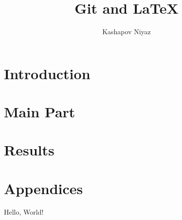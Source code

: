 \documentclass[12pt]{article}
\title{\textbf{ Git and \LaTeX{}}}
\author{Kashapov Niyaz}
\date{}
\begin{document}
\maketitle

\section{Introduction}


\section{Main Part}

\section{Results}

\section{Appendices}

\newpage

\begin{thebibliography}{9} 
 Hello, World!
\end{thebibliography} 
\end{document}
